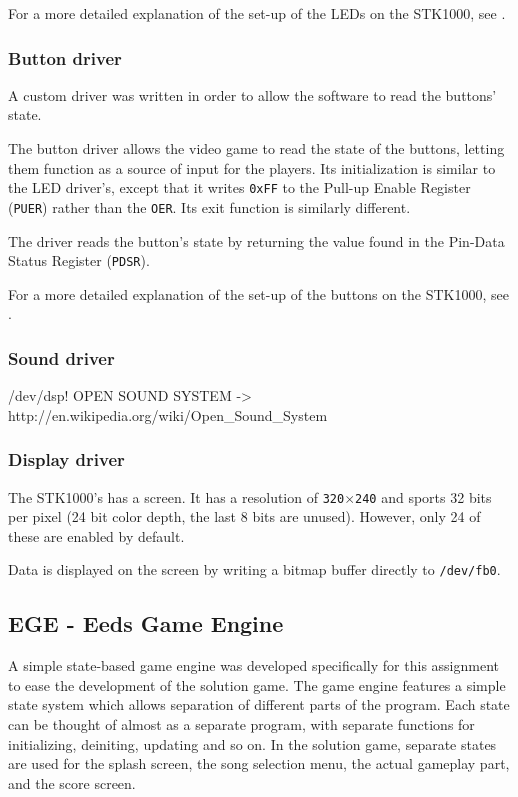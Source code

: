 		For a more detailed explanation of the set-up of the LEDs on the STK1000, see \cite{tdt4258-1}.
	\subsubsection{Button driver}
		A custom driver was written in order to allow the software to read the buttons' state.

		The button driver allows the video game to read the state of the buttons, letting them function as a source of input for the players.
		Its initialization is similar to the LED driver's, except that it writes \texttt{0xFF} to the Pull-up Enable Register (\texttt{PUER}) rather than the \texttt{OER}.
		Its exit function is similarly different.

		The driver reads the button's state by returning the value found in the Pin-Data Status Register (\texttt{PDSR}).


		For a more detailed explanation of the set-up of the buttons on the STK1000, see \cite{tdt4258-1}.	
	\subsubsection{Sound driver}
		/dev/dsp!
		OPEN SOUND SYSTEM -> http://en.wikipedia.org/wiki/Open_Sound_System
	\subsubsection{Display driver}
		The STK1000's has a screen.
		It has a resolution of \texttt{320}$\times$\texttt{240} and sports 32 bits per pixel (24 bit color depth, the last 8 bits are unused)\cite{lab-compendium}.
		However, only 24 of these are enabled by default\cite{avr32-disp}.

		Data is displayed on the screen by writing a bitmap buffer directly to \texttt{/dev/fb0}.


        \subsection{EGE  - Eeds Game Engine}

    A simple state-based game engine was developed specifically for this assignment to ease the development of the solution game.
    The game engine features a simple state system which allows separation of different parts of the program.
    Each state can be thought of almost as a separate program, with separate functions for initializing, deiniting, updating and so on.
    In the solution game, separate states are used for the splash screen, the song selection menu, the actual gameplay part, and the score screen.

